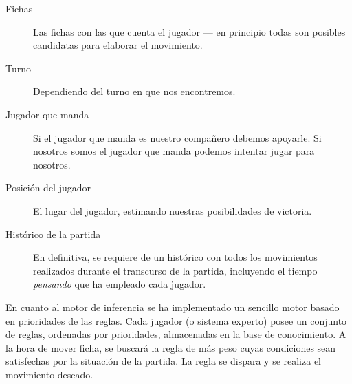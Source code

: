 \begin{description}
    \item[Fichas] Las fichas con las que cuenta el jugador --- en principio todas son posibles candidatas para elaborar
            el movimiento.
    \item[Turno] Dependiendo del turno en que nos encontremos.
    \item[Jugador que manda] Si el jugador que manda es nuestro compañero debemos apoyarle. Si nosotros somos el jugador que
            manda podemos intentar jugar para nosotros.
    \item[Posición del jugador] El lugar del jugador, estimando nuestras posibilidades de victoria.
    \item[Histórico de la partida] En definitiva, se requiere de un histórico con todos los movimientos realizados durante el
            transcurso de la partida, incluyendo el tiempo \emph{pensando} que ha empleado cada jugador.
\end{description}

En cuanto al motor de inferencia se ha implementado un sencillo motor basado en prioridades de las reglas. Cada jugador
(o sistema experto) posee un conjunto de reglas, ordenadas por prioridades, almacenadas en la base de conocimiento.
A la hora de mover ficha, se buscará la regla de más peso cuyas condiciones sean satisfechas por la situación de la partida.
La regla se dispara y se realiza el movimiento deseado.
